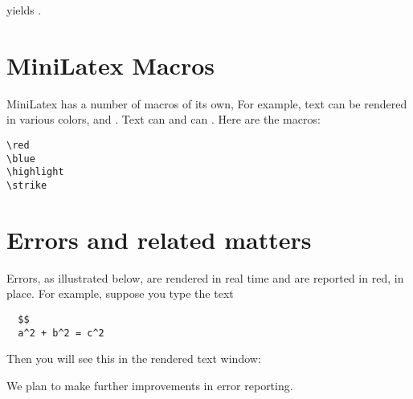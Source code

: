 yields .

\section{MiniLatex Macros}

MiniLatex has a number of macros of its own,  For
example, text can be rendered in various colors, 
and . Text can 
and can . Here are the macros:

\begin{verbatim}
\red
\blue
\highlight
\strike
\end{verbatim}

\section{Errors and related matters}

Errors, as illustrated below, are rendered in real time and are reported in red, in place.
For example, suppose you type the  text

\begin{verbatim}
  $$
  a^2 + b^2 = c^2
\end{verbatim}

Then you will see this in the rendered text window:


We plan to make further improvements in error reporting.
